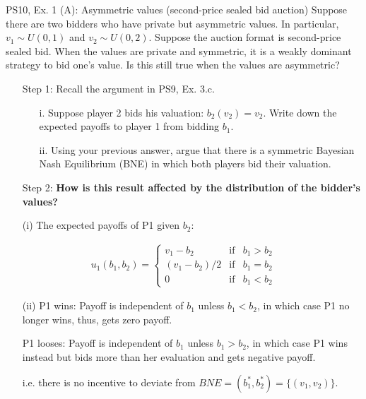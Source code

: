 \begin{frame}{PS10, Ex. 1 (A): Asymmetric values (second-price sealed bid auction)}
    Suppose there are two bidders who have private but asymmetric values. In particular, $v_1\sim U(0, 1)$ and $v_2\sim U(0, 2)$. Suppose the auction format is second-price sealed bid. When the values are private and symmetric, it is a weakly dominant strategy to bid one’s value. Is this still true when the values are asymmetric?
    \begin{multicols}{2}
      \begin{itemize}
        \item[Step 1:] Recall the argument in PS9, Ex. 3.c.
        \begin{itemize}\normalsize
          \item[i.]   Suppose player 2 bids his valuation: $b_2(v_2) = v_2$. Write down the expected payoffs to player 1 from bidding $b_1$.
          \item[ii.]  Using your previous answer, argue that there is a symmetric Bayesian Nash Equilibrium (BNE) in which both players bid their valuation.
        \end{itemize}
        \item[Step 2:] \textbf{How is this result affected by the distribution of the bidder's values?}
      \end{itemize}
      \vfill\null\columnbreak
      \begin{itemize}
        \item[(i)] The expected payoffs of P1 given $b_2$:
      \end{itemize}
      \vspace{-12pt}
      \begin{align*}
        u_1(b_1,b_2)=\left\{\begin{array}{lcl}
          v_1-b_2     & \text{if} & b_1>b_2 \\
          (v_1-b_2)/2 & \text{if} & b_1=b_2 \\
          0           & \text{if} & b_1<b_2
        \end{array}\right.
      \end{align*}
      \vspace{-18pt}
      \begin{itemize}
        \item[(ii)] P1 wins: Payoff is independent of $b_1$ unless $b_1<b_2$, in which case P1 no longer wins, thus, gets zero payoff.
        \item[] P1 looses: Payoff is independent of $b_1$ unless $b_1>b_2$, in which case P1 wins instead but bids more than her evaluation and gets negative payoff.
        \item[] i.e. there is no incentive to deviate from $BNE=(b_1^*,b_2^*)=\{(v_1,v_2)\}$.
      \end{itemize}
      \vfill\null
    \end{multicols}
\end{frame}
